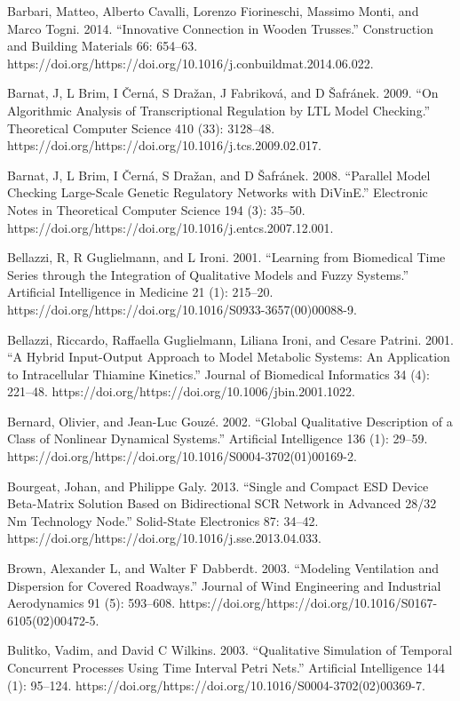 \documentclass[utf8]{gradu3}
\begin{document}
Barbari, Matteo, Alberto Cavalli, Lorenzo Fiorineschi, Massimo Monti, and Marco Togni. 2014. “Innovative Connection in Wooden Trusses.” Construction and Building Materials 66: 654–63. https://doi.org/https://doi.org/10.1016/j.conbuildmat.2014.06.022.

Barnat, J, L Brim, I Černá, S Dražan, J Fabriková, and D Šafránek. 2009. “On Algorithmic Analysis of Transcriptional Regulation by LTL Model Checking.” Theoretical Computer Science 410 (33): 3128–48. https://doi.org/https://doi.org/10.1016/j.tcs.2009.02.017.

Barnat, J, L Brim, I Černá, S Dražan, and D Šafránek. 2008. “Parallel Model Checking Large-Scale Genetic Regulatory Networks with DiVinE.” Electronic Notes in Theoretical Computer Science 194 (3): 35–50. https://doi.org/https://doi.org/10.1016/j.entcs.2007.12.001.

Bellazzi, R, R Guglielmann, and L Ironi. 2001. “Learning from Biomedical Time Series through the Integration of Qualitative Models and Fuzzy Systems.” Artificial Intelligence in Medicine 21 (1): 215–20. https://doi.org/https://doi.org/10.1016/S0933-3657(00)00088-9.

Bellazzi, Riccardo, Raffaella Guglielmann, Liliana Ironi, and Cesare Patrini. 2001. “A Hybrid Input-Output Approach to Model Metabolic Systems: An Application to Intracellular Thiamine Kinetics.” Journal of Biomedical Informatics 34 (4): 221–48. https://doi.org/https://doi.org/10.1006/jbin.2001.1022.

Bernard, Olivier, and Jean-Luc Gouzé. 2002. “Global Qualitative Description of a Class of Nonlinear Dynamical Systems.” Artificial Intelligence 136 (1): 29–59. https://doi.org/https://doi.org/10.1016/S0004-3702(01)00169-2.

Bourgeat, Johan, and Philippe Galy. 2013. “Single and Compact ESD Device Beta-Matrix Solution Based on Bidirectional SCR Network in Advanced 28/32 Nm Technology Node.” Solid-State Electronics 87: 34–42. https://doi.org/https://doi.org/10.1016/j.sse.2013.04.033.

Brown, Alexander L, and Walter F Dabberdt. 2003. “Modeling Ventilation and Dispersion for Covered Roadways.” Journal of Wind Engineering and Industrial Aerodynamics 91 (5): 593–608. https://doi.org/https://doi.org/10.1016/S0167-6105(02)00472-5.

Bulitko, Vadim, and David C Wilkins. 2003. “Qualitative Simulation of Temporal Concurrent Processes Using Time Interval Petri Nets.” Artificial Intelligence 144 (1): 95–124. https://doi.org/https://doi.org/10.1016/S0004-3702(02)00369-7.
\end{document}
